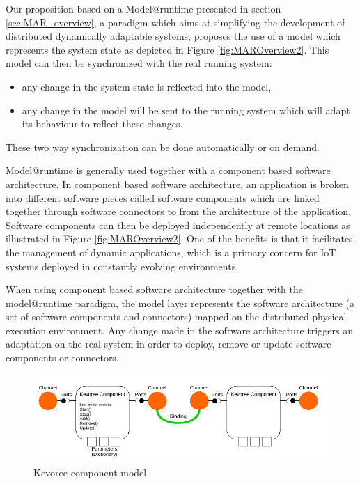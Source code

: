 Our proposition based on a Model@runtime \cite{morin2009mar} presented in section \ref{sec:MAR_overview}, a paradigm which aims at simplifying the development of distributed dynamically adaptable systems, proposes the use of a model which represents the system state as depicted in Figure \ref{fig:MAROverview2}. 
This model can then be synchronized with the real running system: 
\begin{itemize}
	\item any change in the system state is reflected into the model,
	\item any change in the model will be sent to the running system which will adapt its behaviour to reflect these changes. 
\end{itemize}
These two way synchronization can be done automatically or on demand.

Model@runtime is generally used together with a component based software architecture.
In component based software architecture, an application is broken into different software pieces called software components which are linked together through software connectors  \cite{dashofy2002infrastructure,medvidovic2000classification,van2000koala} to from the architecture of the application.
Software components can then be deployed independently at remote locations as illustrated in Figure \ref{fig:MAROverview2}. 
One of the benefits is that it facilitates the management of dynamic applications, which is a primary concern for IoT systems deployed in constantly evolving environments.



When using component based software architecture together with the model@runtime paradigm, the model layer represents the software architecture (a set of software components and connectors) mapped on the distributed physical execution environment.
Any change made in the software architecture triggers an adaptation on the real system in order to deploy, remove or update software components or connectors.   

\begin{figure}[htb]
	\centering
	\includegraphics[width=0.95\columnwidth]{chapters/calpulli.images/componentModel.pdf}
	\caption{Kevoree component model} \label{fig:kevCompModel}
\end{figure}

